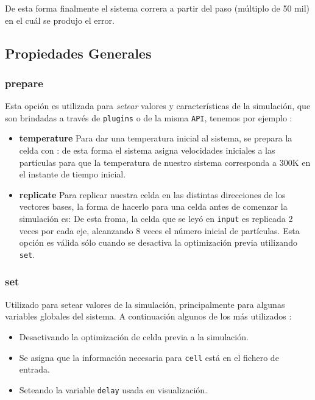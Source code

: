 
De esta forma finalmente el sistema correra a partir del paso (m\'ultiplo de 50
mil) en el cu\'al se produjo el error.

\subsection{Propiedades Generales}
\subsubsection{prepare}

Esta opci\'on es utilizada para \textit{setear} valores y caracter\'isticas de
la simulaci\'on, que son brindadas a trav\'es de \verb|plugins| o de la misma
\verb|API|, tenemos por ejemplo :

\begin{itemize}
 \item \textbf{temperature}
Para dar una temperatura inicial al sistema, se prepara la celda con :
de esta forma el sistema asigna velocidades iniciales a las part\'iculas para
que la temperatura de nuestro sistema corresponda a 300K en el instante de
tiempo inicial.
 \item \textbf{replicate}
Para replicar nuestra celda en las distintas direcciones de los vectores bases,
la forma de hacerlo para una celda antes de comenzar la simulaci\'on es:
De esta froma, la celda que se ley\'o en \verb|input| es replicada 2 veces por
cada eje, alcanzando 8 veces el n\'umero inicial de part\'iculas. Esta opci\'on
es v\'alida s\'olo cuando se desactiva la optimizaci\'on previa utilizando
\verb|set|.
\end{itemize}

\subsubsection{set}
Utilizado para setear valores de la simulaci\'on, principalmente para algunas
variables globales del sistema. A continuaci\'on algunos de los m\'as utilizados
:

\begin{itemize}
 \item Desactivando la optimizaci\'on de celda previa a la simulaci\'on.
 \item Se asigna que la informaci\'on necesaria para \texttt{cell} est\'a en el
fichero de entrada.
 \item Seteando la variable \texttt{delay} usada en visualizaci\'on.
\end{itemize}

